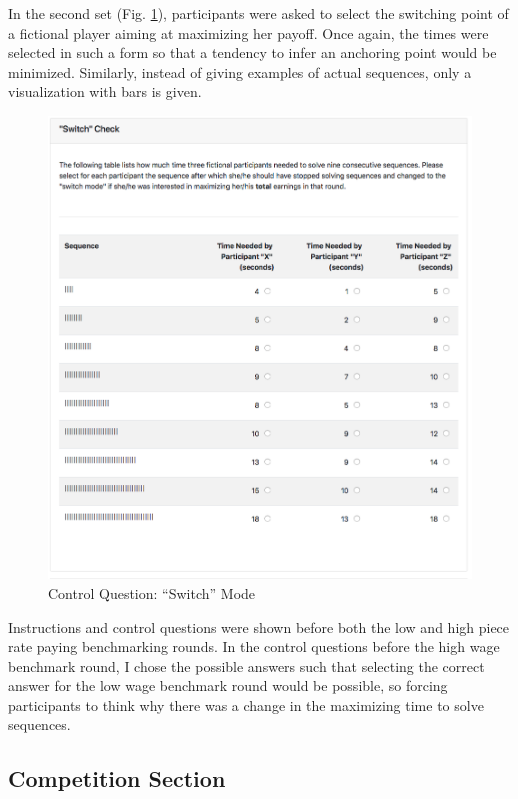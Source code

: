     In the second set (Fig. \ref{fig:cq_switch}), participants were asked to select the switching point of a fictional player aiming at maximizing her payoff. Once again, the times were selected in such a form so that a tendency to infer an anchoring point would be minimized. Similarly, instead of giving examples of actual sequences, only a visualization with bars is given.\\
    
    \begin{figure}[H]
        \centering
        \includegraphics[scale=0.4]{graphs/cq_switch.png}
        \caption{Control Question: ``Switch'' Mode}
        \label{fig:cq_switch}
    \end{figure}
    
    Instructions and control questions were shown before both the low and high piece rate paying benchmarking rounds. In the control questions before the high wage benchmark round, I chose the possible answers such that selecting the correct answer for the low wage benchmark round would be possible, so forcing participants to think why there was a change in the maximizing time to solve sequences.
    
    \subsection{Competition Section}
    \label{ss:compt}
    
